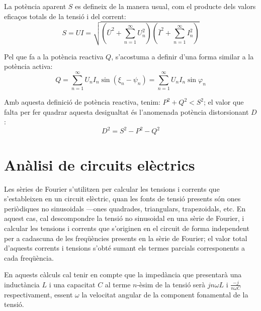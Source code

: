 La potència aparent $S$ es defineix de la manera usual, com el
producte dels valors eficaços totals de la tensió i del corrent:
\begin{equation}
    S = U I = \sqrt{ \left(\bar{U}^2 + \sum_{n=1}^{\infty}U^2_n\right)
    \left(\bar{I}^2 + \sum_{n=1}^{\infty}I^2_n\right) }
\end{equation}

Pel que fa  a la potència reactiva $Q$, s'acostuma  a definir d'una
forma similar a la potència activa:
\begin{equation}
    Q = \sum_{n=1}^\infty U_n I_n
    \sin(\xi_n-\psi_n) =  \sum_{n=1}^\infty U_n I_n
    \sin \varphi_n
\end{equation}

Amb aquesta definició de potència reactiva, tenim: $P^2+Q^2 < S^2$;
el valor que falta per fer quadrar aquesta desigualtat és l'anomenada
potència distorsionant $D$:
\begin{equation}
    D^2 = S^2 - P^2 - Q^2
\end{equation}

\section{Anàlisi de circuits elèctrics}

Les sèries de Fourier s'utilitzen per calcular les tensions i
corrents que s'estableixen en un circuit elèctric, quan les fonts de
tensió presents  són ones periòdiques no sinusoidals ---ones
quadrades, triangulars, trapezoidals, etc. En aquest cas, cal
descompondre la tensió no sinusoidal en una sèrie de Fourier, i
calcular les tensions i corrents que s'originen en el circuit de
forma independent per a cadascuna de les freqüències presents en la
sèrie de Fourier; el valor total d'aquests corrents i tensions
s'obté sumant els termes parcials corresponents a cada freqüència.

En aquests càlculs cal tenir en compte que la impedància que
presentarà una inductància $L$ i una capacitat $C$ al terme
$n$-èsim de la tensió serà $j n \omega L$ i $\frac{-j}{n\omega C}$
respectivament, essent $\omega$ la velocitat angular de la component
fonamental de la tensió.


